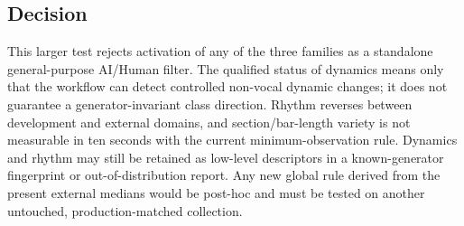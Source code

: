 \subsection{Decision}

This larger test rejects activation of any of the three families as a
standalone general-purpose AI/Human filter. The qualified status of dynamics
means only that the workflow can detect controlled non-vocal dynamic changes;
it does not guarantee a generator-invariant class direction. Rhythm reverses
between development and external domains, and section/bar-length variety is
not measurable in ten seconds with the current minimum-observation rule.
Dynamics and rhythm may still be retained as low-level descriptors in a
known-generator fingerprint or out-of-distribution report. Any new global rule
derived from the present external medians would be post-hoc and must be tested
on another untouched, production-matched collection.
